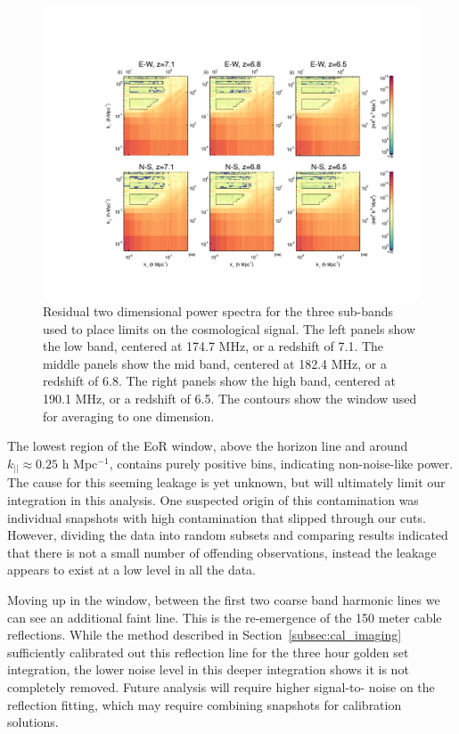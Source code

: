 \documentclass[iop]{emulateapj}
\begin{document}
\begin{figure}
\begin{center}
\includegraphics[width=\textwidth]{2d_res.pdf}
\caption[Deep 2D sub-band power spectra]{
Residual two dimensional power spectra for the three sub-bands used to place limits on the 
cosmological signal. The left panels show the low band, centered at 174.7 MHz, or a 
redshift of 7.1. The middle panels show the mid band, centered at 182.4 MHz, or a redshift 
of 6.8. The right panels show the high band, centered at 190.1 MHz, or a redshift of 6.5. 
The contours show the window used for averaging to one dimension.
\label{fig:2d_ps_subband}
}
\end{center}
\end{figure}

The lowest region of the EoR window, above the horizon line and around $k_{||} \approx 
0.25$ h Mpc$^{-1}$, contains purely positive bins, indicating non-noise-like power. The 
cause for this seeming leakage is yet unknown, but will ultimately limit our integration in this 
analysis. One suspected origin of this contamination was individual snapshots with high 
contamination that slipped through our cuts. However, dividing the data into random 
subsets and comparing results indicated that there is not a small number of offending 
observations, instead the leakage appears to exist at a low level in all the data.

Moving up in the window, between the first two coarse band harmonic lines we can see an 
additional faint line. This is the re-emergence of the 150 meter cable reflections. While the 
method described in Section~\ref{subsec:cal_imaging} sufficiently calibrated out this 
reflection line for the three hour golden set integration, the lower noise level in this deeper 
integration shows it is not completely removed. Future analysis will require higher signal-to-
noise on the reflection fitting, which may require combining snapshots for calibration 
solutions. 
\end{document}
